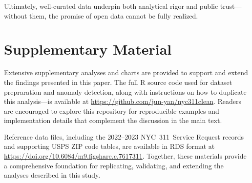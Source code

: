 \documentclass[linenumber]{jdsart}
\begin{document}
Ultimately, well-curated data underpin both analytical rigor and public 
trust—without them, the promise of open data cannot be fully realized.



\section*{Supplementary Material}
Extensive supplementary analyses and charts are provided to support 
and extend the findings presented in this paper.  
The full \textsc{R} source code used for dataset prepraration and anomaly detection, 
along with instructions on how to duplicate this analysis—is available at 
\url{https://github.com/jun-yan/nyc311clean}.  
Readers are encouraged to explore this repository for reproducible examples 
and implementation details that complement the discussion in the main text.  

Reference data files, including the 2022--2023 NYC~311~Service Request 
records and supporting USPS ZIP code tables, are available in RDS format at 
\url{https://doi.org/10.6084/m9.figshare.c.7617311}.  
Together, these materials provide a comprehensive foundation for replicating, 
validating, and extending the analyses described in this study.



\end{document}
